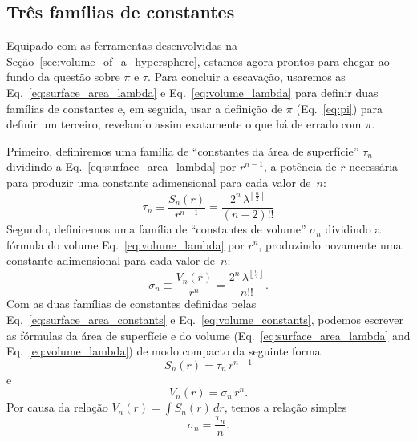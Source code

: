 {%



  \subsection{Três famílias de constantes} %
  \label{sec:three_families_of_constants}

Equipado com as ferramentas desenvolvidas na Seção~\ref{sec:volume_of_a_hypersphere}, estamos agora prontos para chegar ao fundo da questão sobre $\pi$ e $\tau$. Para concluir a escavação, usaremos as Eq.~\eqref{eq:surface_area_lambda} e Eq.~\eqref{eq:volume_lambda} para definir duas famílias de constantes e, em seguida, usar a definição de $\pi$ (Eq.~\eqref{eq:pi}) para definir um terceiro, revelando assim exatamente o que há de errado com $\pi$.

Primeiro, definiremos uma família de ``constantes da área de superfície'' $\tau_n$ dividindo \linebreak a Eq.~\eqref{eq:surface_area_lambda} por $r^{n-1}$, a potência de $r$ necessária para produzir uma constante adimensional para cada valor de~$n$:
\begin{equation}
\label{eq:surface_area_constants}
\tau_n \equiv \frac{S_n(r)}{r^{n-1}} = \frac{2^n\,\lambda^{\left\lfloor \frac{n}{2} \right\rfloor}}{(n-2)!!}
\end{equation}
Segundo, definiremos uma família de ``constantes de volume'' $\sigma_n$ dividindo a fórmula do volume Eq.~\eqref{eq:volume_lambda} por $r^n$, produzindo novamente uma constante adimensional para cada valor de~$n$:
\begin{equation}
\label{eq:volume_constants}
\sigma_n \equiv \frac{V_n(r)}{r^n} = \frac{2^n\,\lambda^{\left\lfloor \frac{n}{2} \right\rfloor}}{n!!}.
\end{equation}
Com as duas famílias de constantes definidas pelas Eq.~\eqref{eq:surface_area_constants} e Eq.~\eqref{eq:volume_constants}, podemos escrever as fórmulas da área de superfície e do volume (Eq.~\eqref{eq:surface_area_lambda} and Eq.~\eqref{eq:volume_lambda}) de modo compacto da seguinte forma:
\[ S_n(r) = \tau_n\,r^{n-1} \]
e
\[ V_n(r) = \sigma_n\,r^n. \]
Por causa da relação $V_n(r) = \int S_n(r)\,dr$, temos a relação simples
\[
\sigma_n = \frac{\tau_n}{n}.
\]

}
